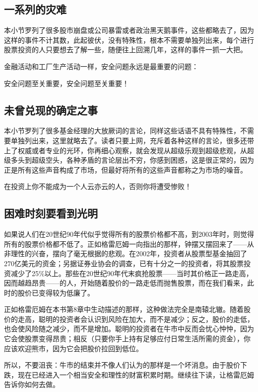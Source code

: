 \documentclass[12pt,oneside]{book}
\begin{document}
\subsection{一系列的灾难}
本小节罗列了很多股市崩盘或公司暴雷或者政治黑天鹅事件，这些都略去了，因为这样的事件不计其数，此起彼伏，没有特殊性，根本不需要单独列出来，每个进行股票投资的人只要想去了解一些，随便往上回溯几年，这样的事件一抓一大把。

金融活动和工厂生产活动一样，安全问题永远是最重要的问题：

安全问题至关重要，安全问题至关重要！


\subsection{未曾兑现的确定之事}
本小节罗列了很多基金经理的大放厥词的言论，同样这些话语不具有特殊性，不需要单独列出来，这里就略去了。读者只要上网，充斥着各种这样的言论，很多还带上了权威或者专业的光环，你再细心观察，就会发现从超级乐观到超级悲观，从超级多头到超级空头，各种矛盾的言论层出不穷，你感到困惑，这是很正常的，因为正是所有这些声音构成了市场，但最好将所有的这些声音都称之为市场的噪音。

在投资上你不能成为一个人云亦云的人，否则你将遭受惨败！



\subsection{困难时刻要看到光明}
如果说人们在20世纪90年代似乎觉得所有的股票价格都不高，到2003年时，则觉得所有的股票价格都不低了。正如格雷厄姆一向指出的那样，钟摆又摆回来了——从非理性的兴奋，摆向了毫无根据的悲观。在2002年，投资者从股票型基金抽回了270亿美元的资金；另据证券业协会的调查，已有十分之一的投资者，将其股票投资减少了25\%以上。那些在20世纪90年代末疯抢股票——当时其价格正一路走高，因而越趋昂贵——的人，开始随着股价的一路走低而抛售股票，而在我们看来，此时的股价已变得较为低廉了。

正如格雷厄姆在本书第8章中生动描述的那样，这种做法完全是南辕北辙。随着股价的走高，聪明的投资者会认识到风险在加大，而不是减少；反之，股价的走低，也会使风险随之减少，而不是增加。聪明的投资者在牛市中反而会忧心忡忡，因为它会使股票变得昂贵；相反（只要你手上持有足够应付日常生活所需的资金），你应该欢迎熊市，因为它会把股价拉回到低位。

所以，不要沮丧：牛市的结束并不像人们认为的那样是一个坏消息。由于股价下跌，现在已经进入一个相当安全和理性的财富积累时期。继续往下读，让格雷厄姆告诉你如何去做。
\end{document}
